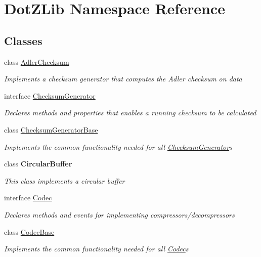 \hypertarget{namespace_dot_z_lib}{}\section{Dot\+Z\+Lib Namespace Reference}
\label{namespace_dot_z_lib}
\subsection*{Classes}
\begin{DoxyCompactItemize}
\item 
class \hyperlink{class_dot_z_lib_1_1_adler_checksum}{Adler\+Checksum}
\begin{DoxyCompactList}\small\item\em Implements a checksum generator that computes the Adler checksum on data \end{DoxyCompactList}\item 
interface \hyperlink{interface_dot_z_lib_1_1_checksum_generator}{Checksum\+Generator}
\begin{DoxyCompactList}\small\item\em Declares methods and properties that enables a running checksum to be calculated \end{DoxyCompactList}\item 
class \hyperlink{class_dot_z_lib_1_1_checksum_generator_base}{Checksum\+Generator\+Base}
\begin{DoxyCompactList}\small\item\em Implements the common functionality needed for all \hyperlink{interface_dot_z_lib_1_1_checksum_generator}{Checksum\+Generator}s \end{DoxyCompactList}\item 
class {\bfseries Circular\+Buffer}
\begin{DoxyCompactList}\small\item\em This class implements a circular buffer \end{DoxyCompactList}\item 
interface \hyperlink{interface_dot_z_lib_1_1_codec}{Codec}
\begin{DoxyCompactList}\small\item\em Declares methods and events for implementing compressors/decompressors \end{DoxyCompactList}\item 
class \hyperlink{class_dot_z_lib_1_1_codec_base}{Codec\+Base}
\begin{DoxyCompactList}\small\item\em Implements the common functionality needed for all \hyperlink{interface_dot_z_lib_1_1_codec}{Codec}s \end{DoxyCompactList}\item 

\end{DoxyCompactItemize}
